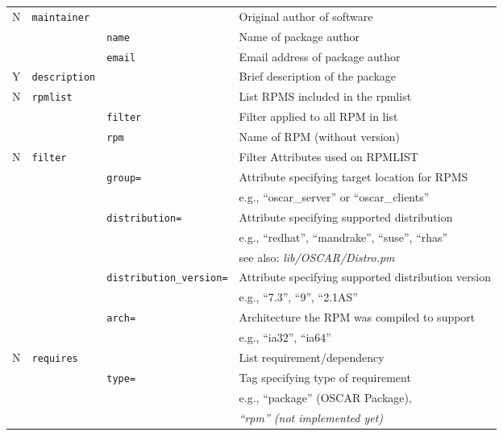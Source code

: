 \begin{table}[htbp]
\begin{center}
\begin{tabular}{|c|l|l|l|}
  N & \verb(maintainer(& & Original author of software            \\\cline{3-4}
    & & \verb(name(   & Name of package author                    \\\cline{3-4}
    & & \verb(email(  & Email address of package author           \\\hline


  Y & \verb(description(&& Brief description of the package              \\ \hline


  N & \verb(rpmlist(&    & List RPMS included in the rpmlist         \\\cline{3-4}
    & & \verb(filter( & Filter applied to all RPM in list         \\\cline{3-4}
    & & \verb(rpm(    & Name of RPM (without version)             \\\hline


  N & \verb(filter(&     & Filter Attributes used on RPMLIST                 \\\cline{3-4}
    & & \verb(group=(   & Attribute specifying target location for RPMS     \\
    & &                 & e.g., ``oscar\_server'' or ``oscar\_clients''     \\\cline{3-4}
    & & \verb(distribution=(& Attribute specifying supported distribution   \\
    & &                 & e.g., ``redhat'', ``mandrake'', ``suse'', ``rhas''\\
    & &                 & see also: \emph{lib/OSCAR/Distro.pm}              \\\cline{3-4}
    & & \verb(distribution_version=(& Attribute specifying supported distribution version  \\
    & &                 & e.g., ``7.3'', ``9'', ``2.1AS''                   \\\cline{3-4}
    & & \verb(arch=(    & Architecture the RPM was compiled to support      \\
    & &                 & e.g., ``ia32'', ``ia64''                          \\\hline


  N & \verb(requires(&   & List requirement/dependency                \\\cline{3-4}
    & & \verb(type=(    & Tag specifying type of requirement         \\
    & &                 &  e.g., ``package'' (OSCAR Package),        \\
    & &                 &  \emph{``rpm'' (not implemented yet)}      \\\hline




\end{tabular}
\end{center}
\end{table}
